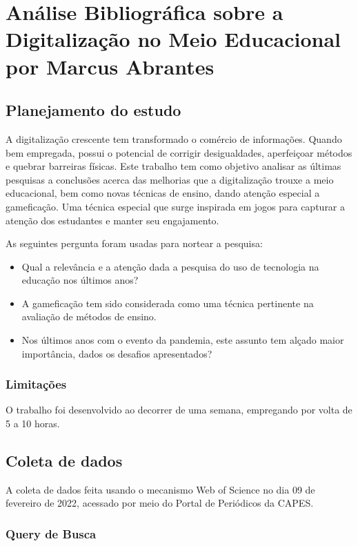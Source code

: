 \chapter{Análise Bibliográfica sobre a Digitalização no Meio Educacional por Marcus Abrantes \label{chap:bibliometria:MarcusABR}}

\section{Planejamento do estudo}

A digitalização crescente tem transformado o comércio de informações. Quando bem empregada, possui o potencial de corrigir desigualdades, aperfeiçoar métodos e quebrar barreiras físicas. Este trabalho tem como objetivo analisar as últimas pesquisas a conclusões acerca das melhorias que a digitalização trouxe a meio educacional, bem como novas técnicas de ensino, dando atenção especial a gameficação. Uma técnica especial que surge inspirada em jogos para capturar a atenção dos estudantes e manter seu engajamento.

As seguintes pergunta foram usadas para nortear a pesquisa:
 

\begin{itemize}
    \item Qual a relevância e a atenção dada a pesquisa do uso de tecnologia na educação nos últimos anos?
    \item A gameficação tem sido considerada como uma técnica pertinente na avaliação de métodos de ensino.
    \item Nos últimos anos com o evento da pandemia, este assunto tem alçado maior importância, dados os desafios apresentados?
\end{itemize}

\subsection{Limitações} O trabalho foi desenvolvido ao decorrer de uma semana, empregando por volta de 5 a 10 horas.

\section{Coleta de dados}

A coleta de dados feita usando o mecanismo Web of Science no dia 09 de fevereiro de 2022, acessado por meio do Portal de Periódicos da CAPES.

\subsection{Query de Busca}

